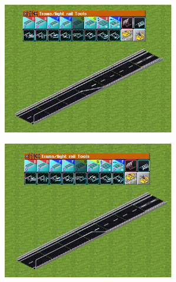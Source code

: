\documentclass{jbook}
\begin{document}
\begin{multicols}{2}
  \includegraphics[width = 75mm]{picture/20210214-road-4-6.png}

  \includegraphics[width = 75mm]{picture/20210214-road-4-7.png}
\end{multicols}

\vspace{10pt}
\end{document}
